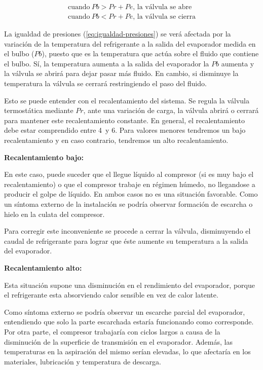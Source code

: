 \begin{gather*}
    \text{cuando}\ Pb > Pr + Pe \text{, la v\'alvula se abre}\\
    \text{cuando}\ Pb < Pr + Pe \text{, la v\'alvula se cierra}
\end{gather*}

La igualdad de presiones (\autoref{eq:igualdad-presiones}) se ver\'a afectada por la variaci\'on de la temperatura del refrigerante a la salida del evaporador medida en el bulbo ($Pb$), puesto que es la temperatura que act\'ua sobre el fluido que contiene el bulbo. S\'i, la temperatura aumenta a la salida del evaporador la $Pb$ aumenta y la v\'alvula se abrir\'a para dejar pasar m\'as fluido. En cambio, si disminuye la temperatura la v\'alvula se cerrar\'a restringiendo el paso del fluido.

Esto se puede entender con el recalentamiento del sistema. Se regula la v\'alvula termost\'atica mediante $Pr$, ante una variaci\'on de carga, la v\'alvula abrir\'a o cerrar\'a para mantener este recalentamiento constante. En general, el recalentamiento debe estar comprendido entre 4\textcelsius\ y 6\textcelsius. Para valores menores tendremos un bajo recalentamiento y en caso contrario, tendremos un alto recalentamiento.

\textbf{Recalentamiento bajo:}

En este caso, puede suceder que el llegue l\'iquido al compresor (si es muy bajo el recalentamiento) o que el compresor trabaje en r\'egimen h\'umedo, no llegandose a producir el golpe de l\'iquido. En ambos casos no es una situaci\'on favorable. Como un s\'intoma externo de la instalaci\'on se podr\'ia observar formaci\'on de escarcha o hielo en la culata del compresor.

Para corregir este inconveniente se procede a cerrar la v\'alvula, disminuyendo el caudal de refrigerante para lograr que \'este aumente su temperatura a la salida del evaporador.

\textbf{Recalentamiento alto:}

Esta situaci\'on supone una disminuci\'on en el rendimiento del evaporador, porque el refrigerante esta absorviendo calor sensible en vez de calor latente.

Como s\'intoma externo se podr\'ia observar un escarche parcial del evaporador, entendiendo que solo la parte escarchada estar\'ia funcionando como corresponde. Por otra parte, el compresor trabajar\'ia con ciclos largos a causa de la disminuci\'on de la superficie de transmisi\'on en el evaporador. Adem\'as, las temperaturas en la aspiraci\'on del mismo ser\'ian elevadas, lo que afectar\'ia en los materiales, lubricaci\'on y temperatura de descarga.


